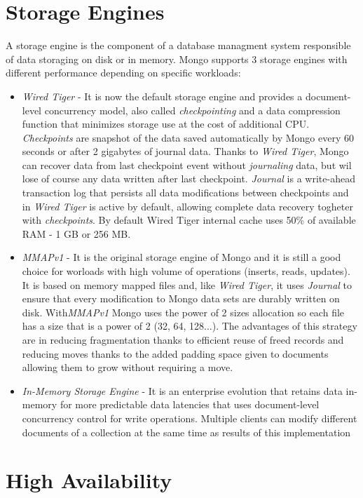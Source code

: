 \section{Storage Engines}
\label{sec:4}
A storage engine is the component of a database managment system responsible of data storaging on disk or in memory. Mongo supports 3 storage engines with different performance depending on specific workloads:
\begin{itemize}
	\item \textit{Wired Tiger} - It is now the default storage engine and provides a document-level concurrency model, also called \textit{checkpointing} and a data compression function that minimizes storage use at the cost of additional CPU.
\textit{Checkpoints} are snapshot of the data saved automatically by Mongo every 60 seconds or after 2 gigabytes of journal data. Thanks to \textit{Wired Tiger}, Mongo can recover data from last checkpoint event without \textit{journaling} data, but wil lose of course any data written after last checkpoint.
\textit{Journal} is a write-ahead transaction log that persists all data modifications between checkpoints and in \textit{Wired Tiger} is active by default, allowing complete data recovery togheter with \textit{checkpoints}.
By default Wired Tiger internal cache uses 50\% of available RAM - 1 GB or 256 MB.
	\item \textit{MMAPv1} - It is  the original storage engine of Mongo and it is still a good choice for worloads with high volume of operations (inserts, reads, updates). It is based on memory mapped files and, like \textit{Wired Tiger}, it uses \textit{Journal} to ensure that every modification  to Mongo data sets are durably written on disk.
With\textit{MMAPv1} Mongo uses the power of 2 sizes allocation so each file has a size that is a power of 2 (32, 64, 128...). The advantages of this strategy are in reducing fragmentation thanks to efficient reuse of freed records and reducing moves thanks to the added padding space given to documents allowing them to grow without requiring a move.
	\item \textit{In-Memory Storage Engine} - It is an enterprise evolution that retains data in-memory for more predictable data latencies that uses document-level concurrency control for write operations. Multiple clients can modify different documents of a collection at the same time as results of this implementation
\end{itemize}

\section{High Availability}
\label{sec:5}

